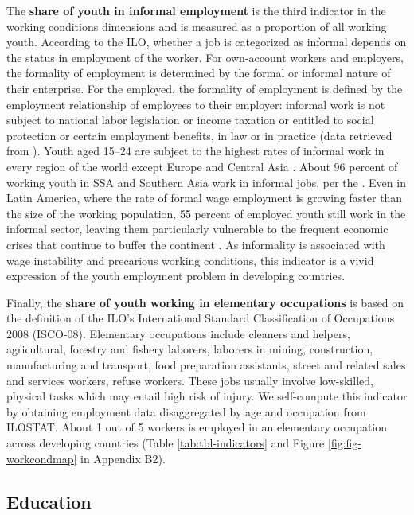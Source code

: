 \documentclass[
  a4paper, twoside, 12pt]{book}
\begin{document}
The \textbf{share of youth in informal employment} is the third indicator in the working conditions dimensions and is measured as a proportion of all working youth. According to the ILO, whether a job is categorized as informal depends on the status in employment of the worker. For own-account workers and employers, the formality of employment is determined by the formal or informal nature of their enterprise. For the employed, the formality of employment is defined by the employment relationship of employees to their employer: informal work is not subject to national labor legislation or income taxation or entitled to social protection or certain employment benefits, in law or in practice (data retrieved from \textcite{bonnet2018}). Youth aged 15--24 are subject to the highest rates of informal work in every region of the world except Europe and Central Asia \autocite{bonnet2018}. About 96 percent of working youth in SSA and Southern Asia work in informal jobs, per the \textcite{ilo2023b}. Even in Latin America, where the rate of formal wage employment is growing faster than the size of the working population, 55 percent of employed youth still work in the informal sector, leaving them particularly vulnerable to the frequent economic crises that continue to buffer the continent \autocite{ilo2015}. As informality is associated with wage instability and precarious working conditions, this indicator is a vivid expression of the youth employment problem in developing countries.

Finally, the \textbf{share of youth working in elementary occupations} is based on the definition of the ILO's International Standard Classification of Occupations 2008 (ISCO-08). Elementary occupations include cleaners and helpers, agricultural, forestry and fishery laborers, laborers in mining, construction, manufacturing and transport, food preparation assistants, street and related sales and services workers, refuse workers. These jobs usually involve low-skilled, physical tasks which may entail high risk of injury. We self-compute this indicator by obtaining employment data disaggregated by age and occupation from ILOSTAT. About 1 out of 5 workers is employed in an elementary occupation across developing countries (Table \ref{tab:tbl-indicators} and Figure \ref{fig:fig-workcondmap} in Appendix B2).

\hypertarget{education}{%
\subsection{Education}\label{education}}
\end{document}
